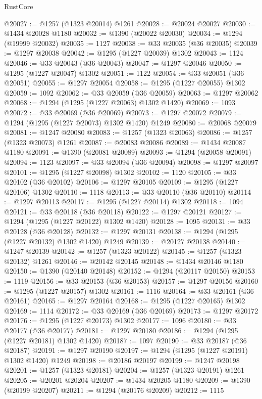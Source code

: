 \begin{lexlean}{RustCore}
\begin{coremodule}
@20027 := @1257 (@1323 @20014) @1261
@20028 := @20024 @20027
@20030 := @1434 @20028 @1180
@20032 := @1390 (@20022 @20030)
@20034 := @1294 (@19999 @20032)
@20035 := 1127
@20038 := @33 @20035 (@36 @20035)
@20039 := @1297 @20038
@20042 := @1295 (@1227 @20039) @1302
@20043 := 1124
@20046 := @33 @20043 (@36 @20043)
@20047 := @1297 @20046
@20050 := @1295 (@1227 @20047) @1302
@20051 := 1122
@20054 := @33 @20051 (@36 @20051)
@20055 := @1297 @20054
@20058 := @1295 (@1227 @20055) @1302
@20059 := 1092
@20062 := @33 @20059 (@36 @20059)
@20063 := @1297 @20062
@20068 := @1294 (@1295 (@1227 @20063) @1302 @1420)
@20069 := 1093
@20072 := @33 @20069 (@36 @20069)
@20073 := @1297 @20072
@20079 := @1294 (@1295 (@1227 @20073) @1302 @1420) @1249
@20080 := @20068 @20079
@20081 := @1247 @20080
@20083 := @1257 (@1323 @20063)
@20086 := @1257 (@1323 @20073) @1261
@20087 := @20083 @20086
@20089 := @1434 @20087 @1180
@20091 := @1390 (@20081 @20089)
@20093 := @1294 (@20058 @20091)
@20094 := 1123
@20097 := @33 @20094 (@36 @20094)
@20098 := @1297 @20097
@20101 := @1295 (@1227 @20098) @1302
@20102 := 1120
@20105 := @33 @20102 (@36 @20102)
@20106 := @1297 @20105
@20109 := @1295 (@1227 @20106) @1302
@20110 := 1118
@20113 := @33 @20110 (@36 @20110)
@20114 := @1297 @20113
@20117 := @1295 (@1227 @20114) @1302
@20118 := 1094
@20121 := @33 @20118 (@36 @20118)
@20122 := @1297 @20121
@20127 := @1294 (@1295 (@1227 @20122) @1302 @1420)
@20128 := 1095
@20131 := @33 @20128 (@36 @20128)
@20132 := @1297 @20131
@20138 := @1294 (@1295 (@1227 @20132) @1302 @1420) @1249
@20139 := @20127 @20138
@20140 := @1247 @20139
@20142 := @1257 (@1323 @20122)
@20145 := @1257 (@1323 @20132) @1261
@20146 := @20142 @20145
@20148 := @1434 @20146 @1180
@20150 := @1390 (@20140 @20148)
@20152 := @1294 (@20117 @20150)
@20153 := 1119
@20156 := @33 @20153 (@36 @20153)
@20157 := @1297 @20156
@20160 := @1295 (@1227 @20157) @1302
@20161 := 1116
@20164 := @33 @20161 (@36 @20161)
@20165 := @1297 @20164
@20168 := @1295 (@1227 @20165) @1302
@20169 := 1114
@20172 := @33 @20169 (@36 @20169)
@20173 := @1297 @20172
@20176 := @1295 (@1227 @20173) @1302
@20177 := 1096
@20180 := @33 @20177 (@36 @20177)
@20181 := @1297 @20180
@20186 := @1294 (@1295 (@1227 @20181) @1302 @1420)
@20187 := 1097
@20190 := @33 @20187 (@36 @20187)
@20191 := @1297 @20190
@20197 := @1294 (@1295 (@1227 @20191) @1302 @1420) @1249
@20198 := @20186 @20197
@20199 := @1247 @20198
@20201 := @1257 (@1323 @20181)
@20204 := @1257 (@1323 @20191) @1261
@20205 := @20201 @20204
@20207 := @1434 @20205 @1180
@20209 := @1390 (@20199 @20207)
@20211 := @1294 (@20176 @20209)
@20212 := 1115

\end{coremodule}
\end{lexlean}

